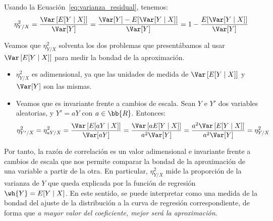 Usando la Ecuación~\ref{eq:varianza_residual}, tenemos:
\begin{equation*}
    \eta_{Y/X}^2 = \frac{\Var\left[E[Y\mid X]\right]}{\Var[Y]} = \dfrac{\Var[Y]-E[\Var[Y\mid X]]}{\Var[Y]} = 1 - \dfrac{E[\Var[Y\mid X]]}{\Var[Y]}
\end{equation*}

Veamos que $\eta_{Y/X}^2$ solventa los dos problemas que presentábamos al usar $\Var\left[E[Y\mid X]\right]$ para medir la bondad de la aproximación.
\begin{itemize}
    \item $\eta_{Y/X}^2$ es adimensional, ya que las unidades de medida de $\Var\left[E[Y\mid X]\right]$ y $\Var[Y]$ son las mismas.
    \item Veamos que es invariante frente a cambios de escala. Sean $Y$ e $Y'$ dos variables aleatorias, y $Y'=aY$ con $a\in\bb{R}$. Entonces:
    \begin{equation*}
        \eta_{Y'/X}^2 = \eta_{aY/X}^2 = \frac{\Var\left[E[aY\mid X]\right]}{\Var[aY]} = \frac{\Var\left[aE[Y\mid X]\right]}{a^2\Var[Y]} = \frac{a^2\Var\left[E[Y\mid X]\right]}{a^2\Var[Y]} = \eta_{Y/X}^2
    \end{equation*}
\end{itemize}

Por tanto, la razón de correlación es un valor adimensional e invariante frente a cambios de escala que nos permite comparar la bondad de la aproximación de una variable a partir de la otra. En particular, $\eta_{Y/X}^2$ mide la proporción de la varianza de $Y$ que queda explicada por la función de regresión $\wh{Y}=E[Y\mid X]$. En este sentido, se puede interpretar como una medida de la bondad del ajuste de la distribución a la curva de regresión correspondiente, de forma que \emph{a mayor valor del coeficiente, mejor será la aproximación}.

